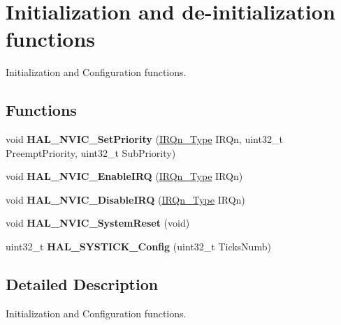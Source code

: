 \hypertarget{group___c_o_r_t_e_x___exported___functions___group1}{}\section{Initialization and de-\/initialization functions}
\label{group___c_o_r_t_e_x___exported___functions___group1}


Initialization and Configuration functions.  


\subsection*{Functions}
\begin{DoxyCompactItemize}
\item 
\mbox{\label{group___c_o_r_t_e_x___exported___functions___group1_ga8581a82025a4780efd00876a66e3e91b}} 
void {\bfseries H\+A\+L\+\_\+\+N\+V\+I\+C\+\_\+\+Set\+Priority} (\hyperlink{group___peripheral__interrupt__number__definition_ga7e1129cd8a196f4284d41db3e82ad5c8}{I\+R\+Qn\+\_\+\+Type} I\+R\+Qn, uint32\+\_\+t Preempt\+Priority, uint32\+\_\+t Sub\+Priority)
\item 
\mbox{\label{group___c_o_r_t_e_x___exported___functions___group1_gaaad4492c1b25e006d69948a15790352a}} 
void {\bfseries H\+A\+L\+\_\+\+N\+V\+I\+C\+\_\+\+Enable\+I\+RQ} (\hyperlink{group___peripheral__interrupt__number__definition_ga7e1129cd8a196f4284d41db3e82ad5c8}{I\+R\+Qn\+\_\+\+Type} I\+R\+Qn)
\item 
\mbox{\label{group___c_o_r_t_e_x___exported___functions___group1_ga50ca6290e068821cb84aa168f3e13967}} 
void {\bfseries H\+A\+L\+\_\+\+N\+V\+I\+C\+\_\+\+Disable\+I\+RQ} (\hyperlink{group___peripheral__interrupt__number__definition_ga7e1129cd8a196f4284d41db3e82ad5c8}{I\+R\+Qn\+\_\+\+Type} I\+R\+Qn)
\item 
\mbox{\label{group___c_o_r_t_e_x___exported___functions___group1_gac83d89028fabdf5d4c38ecf4fbfbefdc}} 
void {\bfseries H\+A\+L\+\_\+\+N\+V\+I\+C\+\_\+\+System\+Reset} (void)
\item 
\mbox{\label{group___c_o_r_t_e_x___exported___functions___group1_gac3a3f0d53c315523a8e6e7bcac1940cf}} 
uint32\+\_\+t {\bfseries H\+A\+L\+\_\+\+S\+Y\+S\+T\+I\+C\+K\+\_\+\+Config} (uint32\+\_\+t Ticks\+Numb)
\end{DoxyCompactItemize}


\subsection{Detailed Description}
Initialization and Configuration functions. 

